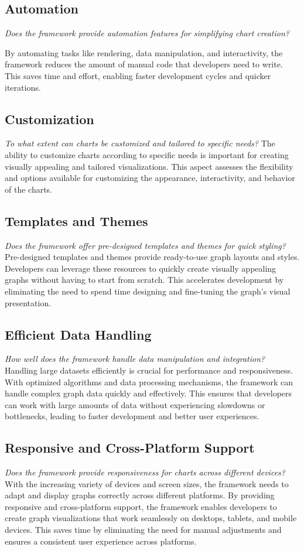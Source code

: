 \documentclass[a4paper, 11pt]{article}
\begin{document}
    \subsection{Automation}
    \textit{Does the framework provide automation features for simplifying chart creation?}
    \smallbreak

    By automating tasks like rendering, data manipulation, and interactivity, the framework reduces the amount of manual code that developers need to write. This saves time and effort, enabling faster development cycles and quicker iterations.
    \subsection{Customization}
    \textit{To what extent can charts be customized and tailored to specific needs?}
    \smallbreak
    The ability to customize charts according to specific needs is important for creating visually appealing and tailored visualizations. This aspect assesses the flexibility and options available for customizing the appearance, interactivity, and behavior of the charts.
    \subsection{Templates and Themes}
    \textit{Does the framework offer pre-designed templates and themes for quick styling?}
    \smallbreak
    Pre-designed templates and themes provide ready-to-use graph layouts and styles. Developers can leverage these resources to quickly create visually appealing graphs without having to start from scratch. This accelerates development by eliminating the need to spend time designing and fine-tuning the graph's visual presentation.
    \subsection{Efficient Data Handling}
    \textit{How well does the framework handle data manipulation and integration?}
    \smallbreak
    Handling large datasets efficiently is crucial for performance and responsiveness. With optimized algorithms and data processing mechanisms, the framework can handle complex graph data quickly and effectively. This ensures that developers can work with large amounts of data without experiencing slowdowns or bottlenecks, leading to faster development and better user experiences.
    \subsection{Responsive and Cross-Platform Support}
    \textit{Does the framework provide responsiveness for charts across different devices?}
    \smallbreak
    With the increasing variety of devices and screen sizes, the framework needs to adapt and display graphs correctly across different platforms. By providing responsive and cross-platform support, the framework enables developers to create graph visualizations that work seamlessly on desktops, tablets, and mobile devices. This saves time by eliminating the need for manual adjustments and ensures a consistent user experience across platforms.
\end{document}
